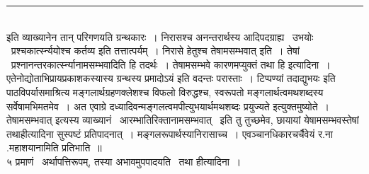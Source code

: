 \documentclass[11pt, openany]{book}
\begin{document}
\begin{multicols}{2}
\noindent
\rule{1\linewidth}{0.5pt}\\

इति व्याख्यानेन तान् परिगणयति ग्रन्थकारः~। निरासश्च अनन्तरार्थस्य आदिपदग्राह्य \textendash\ उभयोः \textendash\ प्रश्चकार्त्स्न्ययोश्च कर्तव्य इति तत्तात्पर्यम्~। निरासे हेतुश्च तेषामसम्भवात् इति~। तेषां \textendash\ प्रश्नानन्तरकार्त्स्न्यानामसम्भवादिति हि तदर्थः~। तेषामसम्भवे कारणमप्युक्तं {\qt तथा हि} इत्यादिना~। एतेनोद्योताभिप्रायप्रकाशकस्यास्य ग्रन्थस्य {\qt प्रमादोऽयं} इति वदन्तः परास्ताः~। टिप्पण्यां तदाद्युभयः इति पाठविपर्यासमाश्रित्य मङ्गलार्थग्रहणक्लेशश्च विफलो विरुद्धश्च, स्वरूपतो मङ्गलार्थत्वमथशब्दस्य सर्वेषामभिमतमेव~। अत एवाग्रे दध्यादिवन्मङ्गलत्वमपीत्युभयार्थमथशब्दः प्रयुज्यते इत्युक्तमु्ष्योते~। {\qt तेषामसम्भवात्} इत्यस्य व्याख्यानं \textendash\ आरम्भातिरिक्तानामसम्भवात् \textendash\ इति तु तुच्छमेव, छायायां येषामसम्भवस्तेषां तथाहीत्यादिना सुस्पष्टं प्रतिपादनात्~। मङ्गलरूपार्थस्यानिरासाच्च~। एवञ्चानधिकारचर्चैवेयं र.ना .महाशयानामिति प्रतिभाति~॥\\

५ प्रमाणं \textendash\ अर्थापत्तिरूपम्, तस्या अभावमुपपादयति \textendash\ तथा हीत्यादिना~।
\end{multicols}

\newpage
\end{document}
